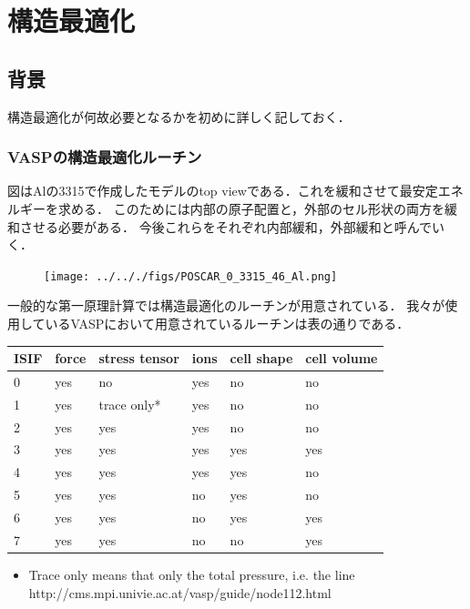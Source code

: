 \chapter{構造最適化}\label{ux69cbux9020ux6700ux9069ux5316}

    \section{背景}\label{ux80ccux666f}

構造最適化が何故必要となるかを初めに詳しく記しておく．

    \subsection{VASPの構造最適化ルーチン}\label{vaspux306eux69cbux9020ux6700ux9069ux5316ux30ebux30fcux30c1ux30f3}

図はAlの3315で作成したモデルのtop
viewである．これを緩和させて最安定エネルギーを求める．
このためには内部の原子配置と，外部のセル形状の両方を緩和させる必要がある．
今後これらをそれぞれ内部緩和，外部緩和と呼んでいく．

\begin{figure}[H]
\centering
\begin{center}
\texttt{[image: ../.././figs/POSCAR\_0\_3315\_46\_Al.png]}
\end{center}
\caption{{}}

\label{fig:This}
\end{figure}

一般的な第一原理計算では構造最適化のルーチンが用意されている．
我々が使用しているVASPにおいて用意されているルーチンは表の通りである．

\begin{longtable}[]{@{}llllll@{}}
\toprule
ISIF & force & stress tensor & ions & cell shape & cell
volume\tabularnewline
\midrule
\endhead
0 & yes & no & yes & no & no\tabularnewline
1 & yes & trace only* & yes & no & no\tabularnewline
2 & yes & yes & yes & no & no\tabularnewline
3 & yes & yes & yes & yes & yes\tabularnewline
4 & yes & yes & yes & yes & no\tabularnewline
5 & yes & yes & no & yes & no\tabularnewline
6 & yes & yes & no & yes & yes\tabularnewline
7 & yes & yes & no & no & yes\tabularnewline
\bottomrule
\end{longtable}

\begin{itemize}
\tightlist
\item
  Trace only means that only the total pressure, i.e. the line
  http://cms.mpi.univie.ac.at/vasp/guide/node112.html
\end{itemize}


